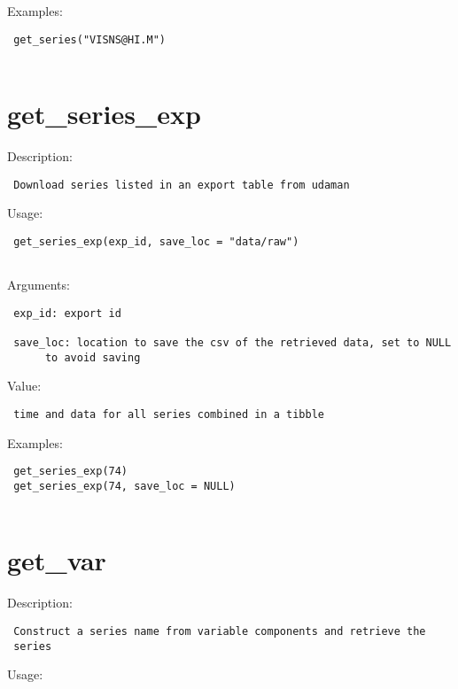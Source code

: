 \documentclass[
  letterpaper,
  DIV=11,
  numbers=noendperiod]{scrreport}
\begin{document}
Examples:

\begin{verbatim}
 get_series("VISNS@HI.M")
 
\end{verbatim}

\hypertarget{get_series_exp}{%
\section{get\_series\_exp}\label{get_series_exp}}

Description:

\begin{verbatim}
 Download series listed in an export table from udaman
\end{verbatim}

Usage:

\begin{verbatim}
 get_series_exp(exp_id, save_loc = "data/raw")
 
\end{verbatim}

Arguments:

\begin{verbatim}
 exp_id: export id

 save_loc: location to save the csv of the retrieved data, set to NULL
      to avoid saving
\end{verbatim}

Value:

\begin{verbatim}
 time and data for all series combined in a tibble
\end{verbatim}

Examples:

\begin{verbatim}
 get_series_exp(74)
 get_series_exp(74, save_loc = NULL)
 
\end{verbatim}

\hypertarget{get_var}{%
\section{get\_var}\label{get_var}}

Description:

\begin{verbatim}
 Construct a series name from variable components and retrieve the
 series
\end{verbatim}

Usage:
\end{document}
